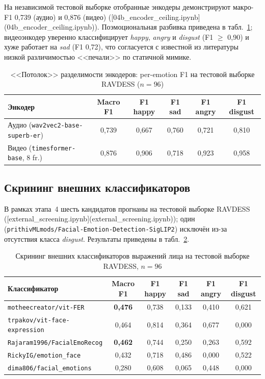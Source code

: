 \documentclass[a4paper, 12pt, oneside, openany]{article}
\begin{document}
На независимой тестовой выборке отобранные энкодеры демонстрируют макро-F1 0,739 (аудио) и 0,876 (видео) ([04b\_encoder\_ceiling.ipynb](04b\_encoder\_ceiling.ipynb)). Поэмоциональная разбивка приведена в табл.~\ref{tab:enc_ceiling}; видеоэнкодер уверенно классифицирует \textit{happy}, \textit{angry} и \textit{disgust} (F1 $\geq$ 0,90) и хуже работает на \textit{sad} (F1 0,72), что согласуется с известной из литературы низкой различимостью <<печали>> по статичной мимике.

\begin{table}[H]
\caption{<<Потолок>> разделимости энкодеров: per-emotion F1 на тестовой выборке RAVDESS ($n=96$)}
\label{tab:enc_ceiling}
\centering
\small
\begin{tabular}{|p{4cm}|c|c|c|c|c|}
\hline
\textbf{Энкодер} & \textbf{Macro F1} & \textbf{F1 happy} & \textbf{F1 sad} & \textbf{F1 angry} & \textbf{F1 disgust} \\
\hline
Аудио (\texttt{wav2vec2-base-superb-er}) & 0,739 & 0,667 & 0,760 & 0,721 & 0,810 \\
\hline
Видео (\texttt{timesformer-base}, 8 fr.) & 0,876 & 0,906 & 0,718 & 0,923 & 0,958 \\
\hline
\end{tabular}
\end{table}

\subsection{Скрининг внешних классификаторов}

В рамках этапа~4 шесть кандидатов прогнаны на тестовой выборке RAVDESS ([external\_screening.ipynb](external\_screening.ipynb)); один (\texttt{prithivMLmods/Facial-Emotion-Detection-SigLIP2}) исключён из-за отсутствия класса \textit{disgust}. Результаты приведены в табл.~\ref{tab:ext_screen}.

\begin{table}[H]
\caption{Скрининг внешних классификаторов выражений лица на тестовой выборке RAVDESS, $n=96$}
\label{tab:ext_screen}
\centering
\small
\begin{tabular}{|p{6cm}|c|c|c|c|c|}
\hline
\textbf{Классификатор} & \textbf{Macro F1} & \textbf{F1 happy} & \textbf{F1 sad} & \textbf{F1 angry} & \textbf{F1 disgust} \\
\hline
\texttt{motheecreator/vit-FER} & \textbf{0,476} & 0,738 & 0,133 & 0,410 & 0,621 \\
\hline
\texttt{trpakov/vit-face-expression} & 0,464 & 0,814 & 0,364 & 0,677 & 0,000 \\
\hline
\texttt{Rajaram1996/FacialEmoRecog} & \textbf{0,462} & 0,744 & 0,250 & 0,263 & 0,592 \\
\hline
\texttt{RickyIG/emotion\_face} & 0,432 & 0,718 & 0,486 & 0,000 & 0,522 \\
\hline
\texttt{dima806/facial\_emotions} & 0,280 & 0,608 & 0,065 & 0,448 & 0,000 \\
\hline
\end{tabular}
\end{table}
\end{document}
